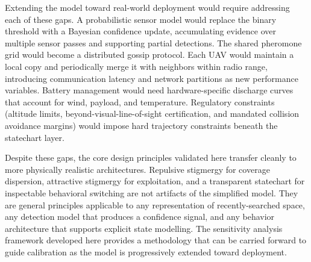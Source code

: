 Extending the model toward real-world deployment would require addressing each of these gaps. A probabilistic sensor model would replace the binary threshold with a Bayesian confidence update, accumulating evidence over multiple sensor passes and supporting partial detections. The shared pheromone grid would become a distributed gossip protocol. Each UAV would maintain a local copy and periodically merge it with neighbors within radio range, introducing communication latency and network partitions as new performance variables. Battery management would need hardware-specific discharge curves that account for wind, payload, and temperature. Regulatory constraints (altitude limits, beyond-visual-line-of-sight certification, and mandated collision avoidance margins) would impose hard trajectory constraints beneath the statechart layer.

Despite these gaps, the core design principles validated here transfer cleanly to more physically realistic architectures. Repulsive stigmergy for coverage dispersion, attractive stigmergy for exploitation, and a transparent statechart for inspectable behavioral switching are not artifacts of the simplified model. They are general principles applicable to any representation of recently-searched space, any detection model that produces a confidence signal, and any behavior architecture that supports explicit state modelling. The sensitivity analysis framework developed here provides a methodology that can be carried forward to guide calibration as the model is progressively extended toward deployment.

